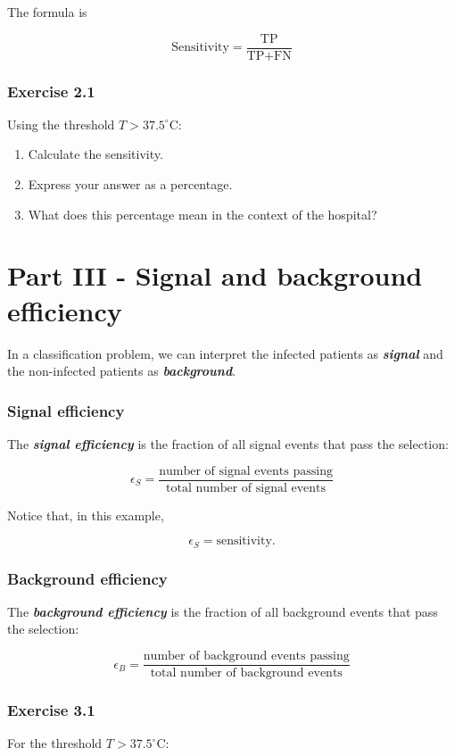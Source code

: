 \documentclass{course_sheet}
\begin{document}
The formula is

\[
{
\text{Sensitivity}
=
\frac{\text{TP}}{\text{TP}+\text{FN}}
}
\]

\subsubsection*{Exercise 2.1}
Using the threshold $T>37.5^\circ\mathrm{C}$:

\begin{enumerate}
\item
Calculate the sensitivity.

\item
Express your answer as a percentage.

\item
What does this percentage mean in the context of the hospital?

\end{enumerate}
\clearpage
\section*{Part III - Signal and background efficiency}
In a classification problem, we can interpret the infected patients as \textbf{\textit{signal}} and the non-infected patients as \textbf{\textit{background}}.

\subsubsection*{Signal efficiency}
The \textbf{\textit{signal efficiency}} is the fraction of all signal events that pass the selection:

\[
{
\epsilon_S =
\frac{\text{number of signal events passing}}
{\text{total number of signal events}}
}
\]

Notice that, in this example,

\[
\epsilon_S = \text{sensitivity}.
\]

\subsubsection*{Background efficiency}
The \textbf{\textit{background efficiency}} is the fraction of all background events that pass the selection:

\[
{
\epsilon_B =
\frac{\text{number of background events passing}}
{\text{total number of background events}}
}
\]

\subsubsection*{Exercise 3.1}
For the threshold $T>37.5^\circ\mathrm{C}$:
\end{document}
